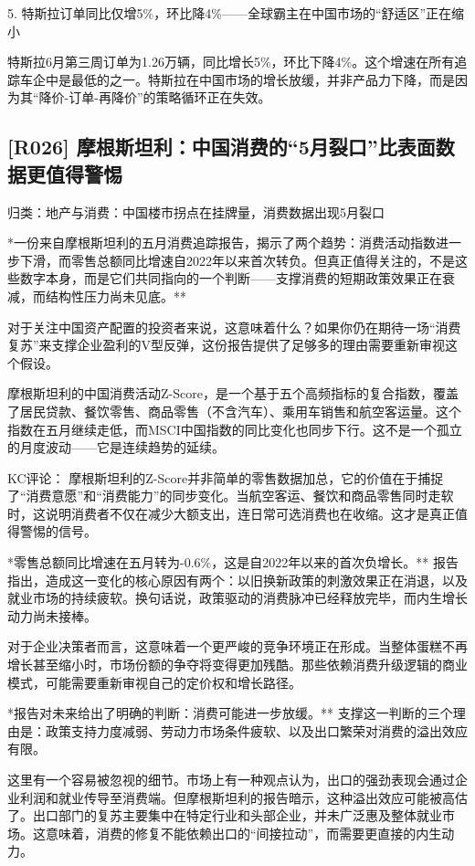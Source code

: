 \documentclass[11pt]{ctexart}
\begin{document}
5. 特斯拉订单同比仅增5\%，环比降4\%——全球霸主在中国市场的“舒适区”正在缩小

特斯拉6月第三周订单为1.26万辆，同比增长5\%，环比下降4\%。这个增速在所有追踪车企中是最低的之一。特斯拉在中国市场的增长放缓，并非产品力下降，而是因为其“降价-订单-再降价”的策略循环正在失效。

\subsection{[R026] 摩根斯坦利：中国消费的“5月裂口”比表面数据更值得警惕}
{\small\color{refgray}归类：地产与消费：中国楼市拐点在挂牌量，消费数据出现5月裂口}

*一份来自摩根斯坦利的五月消费追踪报告，揭示了两个趋势：消费活动指数进一步下滑，而零售总额同比增速自2022年以来首次转负。但真正值得关注的，不是这些数字本身，而是它们共同指向的一个判断——支撑消费的短期政策效果正在衰减，而结构性压力尚未见底。**

对于关注中国资产配置的投资者来说，这意味着什么？如果你仍在期待一场“消费复苏”来支撑企业盈利的V型反弹，这份报告提供了足够多的理由需要重新审视这个假设。

摩根斯坦利的中国消费活动Z-Score，是一个基于五个高频指标的复合指数，覆盖了居民贷款、餐饮零售、商品零售（不含汽车）、乘用车销售和航空客运量。这个指数在五月继续走低，而MSCI中国指数的同比变化也同步下行。这不是一个孤立的月度波动——它是连续趋势的延续。

KC评论： 摩根斯坦利的Z-Score并非简单的零售数据加总，它的价值在于捕捉了“消费意愿”和“消费能力”的同步变化。当航空客运、餐饮和商品零售同时走软时，这说明消费者不仅在减少大额支出，连日常可选消费也在收缩。这才是真正值得警惕的信号。

*零售总额同比增速在五月转为-0.6\%，这是自2022年以来的首次负增长。** 报告指出，造成这一变化的核心原因有两个：以旧换新政策的刺激效果正在消退，以及就业市场的持续疲软。换句话说，政策驱动的消费脉冲已经释放完毕，而内生增长动力尚未接棒。

对于企业决策者而言，这意味着一个更严峻的竞争环境正在形成。当整体蛋糕不再增长甚至缩小时，市场份额的争夺将变得更加残酷。那些依赖消费升级逻辑的商业模式，可能需要重新审视自己的定价权和增长路径。

*报告对未来给出了明确的判断：消费可能进一步放缓。** 支撑这一判断的三个理由是：政策支持力度减弱、劳动力市场条件疲软、以及出口繁荣对消费的溢出效应有限。

这里有一个容易被忽视的细节。市场上有一种观点认为，出口的强劲表现会通过企业利润和就业传导至消费端。但摩根斯坦利的报告暗示，这种溢出效应可能被高估了。出口部门的复苏主要集中在特定行业和头部企业，并未广泛惠及整体就业市场。这意味着，消费的修复不能依赖出口的“间接拉动”，而需要更直接的内生动力。
\end{document}
